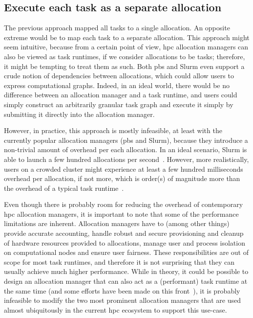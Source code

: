 \subsection*{Execute each task as a separate allocation}
The previous approach mapped all tasks to a single allocation. An opposite extreme would be to map
each task to a separate allocation. This approach might seem intuitive, because from a certain
point of view, \gls{hpc} allocation managers can also be viewed as task runtimes,
if we consider allocations to be tasks; therefore, it might be tempting to treat them as such. Both
\gls{pbs} and Slurm even support a crude notion of dependencies between
allocations, which could allow users to express computational graphs. Indeed, in an ideal world,
there would be no difference between an allocation manager and a task runtime, and users could
simply construct an arbitrarily granular task graph and execute it simply by submitting it directly
into the allocation manager.

However, in practice, this approach is mostly infeasible, at least with the currently popular
allocation managers (\gls{pbs} and Slurm), because they introduce a non-trivial
amount of overhead per each allocation. In an ideal scenario, Slurm is able to launch a few hundred
allocations per second~\cite{slurm-throughput}. However, more realistically, users on a crowded
cluster might experience at least a few hundred milliseconds overhead per allocation, if not more,
which is order(s) of magnitude more than the overhead of a typical task
runtime~\cite{rsds}.

Even though there is probably room for reducing the overhead of contemporary
\gls{hpc} allocation managers, it is important to note that some of the
performance limitations are inherent. Allocation managers have to (among other things) provide
accurate accounting, handle robust and secure provisioning and cleanup of hardware resources
provided to allocations, manage user and process isolation on computational nodes and ensure user
fairness. These responsibilities are out of scope for most task runtimes, and therefore it is not
surprising that they can usually achieve much higher performance. While in theory, it could be
possible to design an allocation manager that can also act as a (performant) task runtime at the
same time (and some efforts have been made on this front~\cite{flux}), it is
probably infeasible to modify the two most prominent allocation managers that are used almost
ubiquitously in the current \gls{hpc} ecosystem to support this use-case.

